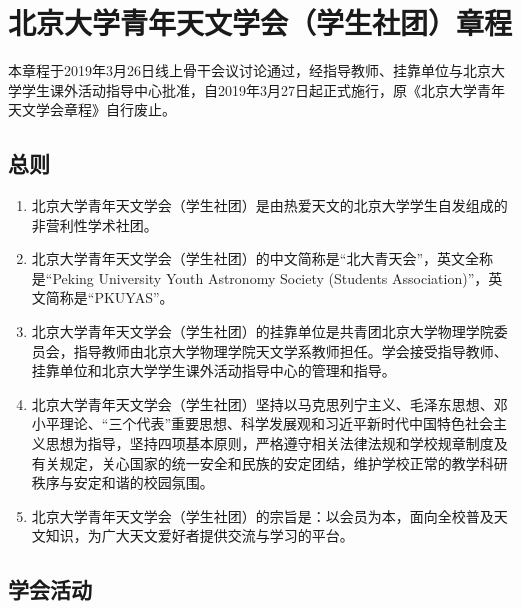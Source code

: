 \chapter{北京大学青年天文学会（学生社团）章程}

本章程于2019年3月26日线上骨干会议讨论通过，经指导教师、挂靠单位与北京大学学生课外活动指导中心批准，自2019年3月27日起正式施行，原《北京大学青年天文学会章程》自行废止。

\section{总则}

\begin{enumerate}
    \item 北京大学青年天文学会（学生社团）是由热爱天文的北京大学学生自发组成的非营利性学术社团。
    
    \item 北京大学青年天文学会（学生社团）的中文简称是“北大青天会”，英文全称是“Peking University Youth Astronomy Society (Students Association)”，英文简称是“PKUYAS”。
    
    \item 北京大学青年天文学会（学生社团）的挂靠单位是共青团北京大学物理学院委员会，指导教师由北京大学物理学院天文学系教师担任。学会接受指导教师、挂靠单位和北京大学学生课外活动指导中心的管理和指导。
    
    \item 北京大学青年天文学会（学生社团）坚持以马克思列宁主义、毛泽东思想、邓小平理论、“三个代表”重要思想、科学发展观和习近平新时代中国特色社会主义思想为指导，坚持四项基本原则，严格遵守相关法律法规和学校规章制度及有关规定，关心国家的统一安全和民族的安定团结，维护学校正常的教学科研秩序与安定和谐的校园氛围。
    
    \item 北京大学青年天文学会（学生社团）的宗旨是：以会员为本，面向全校普及天文知识，为广大天文爱好者提供交流与学习的平台。
\end{enumerate}

\section{学会活动}

